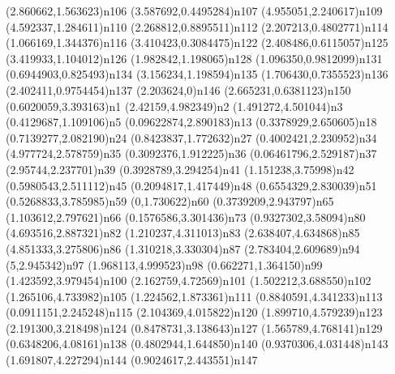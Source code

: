 \dotnode[](2.860662,1.563623){n106}
\dotnode[](3.587692,0.4495284){n107}
\dotnode[](4.955051,2.240617){n109}
\dotnode[](4.592337,1.284611){n110}
\dotnode[](2.268812,0.8895511){n112}
\dotnode[](2.207213,0.4802771){n114}
\dotnode[](1.066169,1.344376){n116}
\dotnode[](3.410423,0.3084475){n122}
\dotnode[](2.408486,0.6115057){n125}
\dotnode[](3.419933,1.104012){n126}
\dotnode[](1.982842,1.198065){n128}
\dotnode[](1.096350,0.9812099){n131}
\dotnode[](0.6944903,0.825493){n134}
\dotnode[](3.156234,1.198594){n135}
\dotnode[](1.706430,0.7355523){n136}
\dotnode[](2.402411,0.9754454){n137}
\dotnode[](2.203624,0){n146}
\dotnode[](2.665231,0.6381123){n150}
\dotnode[](0.6020059,3.393163){n1}
\dotnode[](2.42159,4.982349){n2}
\dotnode[](1.491272,4.501044){n3}
\dotnode[fillcolor=gray](0.4129687,1.109106){n5}
\dotnode[fillcolor=gray](0.09622874,2.890183){n13}
\dotnode[](0.3378929,2.650605){n18}
\dotnode[](0.7139277,2.082190){n24}
\dotnode[](0.8423837,1.772632){n27}
\dotnode[fillcolor=gray](0.4002421,2.230952){n34}
\dotnode[](4.977724,2.578759){n35}
\dotnode[](0.3092376,1.912225){n36}
\dotnode[](0.06461796,2.529187){n37}
\dotnode[](2.95744,2.237701){n39}
\dotnode[](0.3928789,3.294254){n41}
\dotnode[](1.151238,3.75998){n42}
\dotnode[](0.5980543,2.511112){n45}
\dotnode[](0.2094817,1.417449){n48}
\dotnode[](0.6554329,2.830039){n51}
\dotnode[](0.5268833,3.785985){n59}
\dotnode[](0,1.730622){n60}
\dotnode[](0.3739209,2.943797){n65}
\dotnode[](1.103612,2.797621){n66}
\dotnode[](0.1576586,3.301436){n73}
\dotnode[](0.9327302,3.58094){n80}
\dotnode[](4.693516,2.887321){n82}
\dotnode[](1.210237,4.311013){n83}
\dotnode[](2.638407,4.634868){n85}
\dotnode[](4.851333,3.275806){n86}
\dotnode[](1.310218,3.330304){n87}
\dotnode[](2.783404,2.609689){n94}
\dotnode[](5,2.945342){n97}
\dotnode[](1.968113,4.999523){n98}
\dotnode[](0.662271,1.364150){n99}
\dotnode[](1.423592,3.979454){n100}
\dotnode[](2.162759,4.72569){n101}
\dotnode[fillcolor=gray](1.502212,3.688550){n102}
\dotnode[](1.265106,4.733982){n105}
\dotnode[](1.224562,1.873361){n111}
\dotnode[](0.8840591,4.341233){n113}
\dotnode[](0.0911151,2.245248){n115}
\dotnode[](2.104369,4.015822){n120}
\dotnode[](1.899710,4.579239){n123}
\dotnode[](2.191300,3.218498){n124}
\dotnode[fillcolor=gray](0.8478731,3.138643){n127}
\dotnode[](1.565789,4.768141){n129}
\dotnode[](0.6348206,4.08161){n138}
\dotnode[](0.4802944,1.644850){n140}
\dotnode[](0.9370306,4.031448){n143}
\dotnode[](1.691807,4.227294){n144}
\dotnode[](0.9024617,2.443551){n147}
